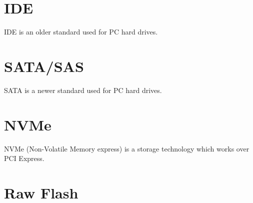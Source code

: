 \documentclass[12pt,article]{memoir}
\begin{document}
\section{IDE}
IDE is an older standard used for PC hard drives.
\section{SATA/SAS}
SATA is a newer standard used for PC hard drives.
\section{NVMe}
NVMe (Non-Volatile Memory express) is a storage technology which works over PCI Express.
\section{Raw Flash}

\end{document}
